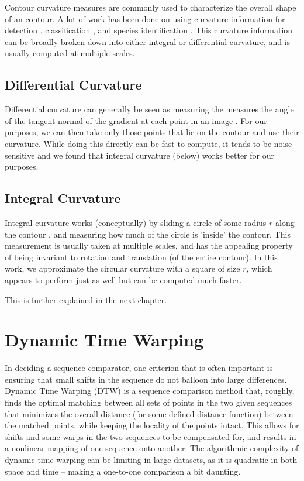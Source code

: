 Contour curvature measures are commonly used to characterize the overall shape of an contour. 
A lot of work has been done on using curvature information for detection \cite{monroy2011beyond}, classification \cite{fischer2014image}, and species identification \cite{kumar2012leafsnap}.
This curvature information can be broadly broken down into either integral or differential curvature, and is usually computed at multiple scales.

\subsection{Differential Curvature}

Differential curvature can generally be seen as measuring the measures the angle of the tangent normal of the gradient at each point in an image \cite{fischer2014image}.
For our purposes, we can then take only those points that lie on the contour and use their curvature.
While doing this directly can be fast to compute, it tends to be noise sensitive and we found that integral curvature (below) works better for our purposes.

\subsection{Integral Curvature}

Integral curvature works (conceptually) by sliding a circle of some radius $r$ along the contour \cite{pottmann2007integral}, and measuring how much of the circle is 'inside' the contour.
This measurement is usually taken at multiple scales, and has the appealing property of being invariant to rotation and translation (of the entire contour).
In this work, we approximate the circular curvature with a square of size $r$, which appears to perform just as well but can be computed much faster.

This is further explained in the next chapter.

\section{Dynamic Time Warping}

In deciding a sequence comparator, one criterion that is often important is ensuring that small shifts in the sequence do not balloon into large differences.
Dynamic Time Warping (DTW) is a sequence comparison method that, roughly, finds the optimal matching between all sets of points in the two given sequences that minimizes the overall distance (for some defined distance function) between the matched points, while keeping the locality of the points intact.
This allows for shifts and some warps in the two sequences to be compensated for, and results in a nonlinear mapping of one sequence onto another.
The algorithmic complexity of dynamic time warping can be limiting in large datasets, as it is quadratic in both space and time -- making a one-to-one comparison a bit daunting.

